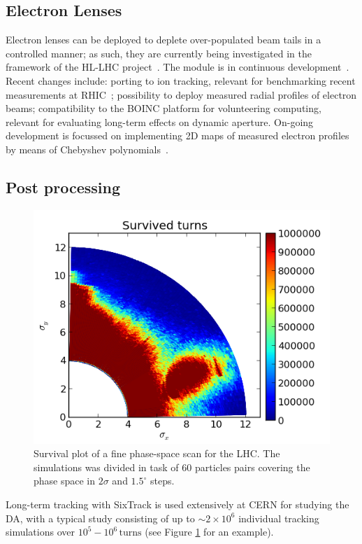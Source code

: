 \documentclass{ws-ijmpa}
\begin{document}
\subsection{Electron Lenses}
Electron lenses can be deployed to deplete over-populated beam tails in a controlled manner; as such, they are currently being investigated in the framework of the HL-LHC project~\cite{HL-TDR}. The module is in continuous development~\cite{elens-miriam}. Recent changes include: porting to ion tracking, relevant for benchmarking recent measurements at RHIC~\cite{RHIC-Mirarchi}; possibility to deploy measured radial profiles of electron beams; compatibility to the BOINC platform for volunteering computing, relevant for evaluating long-term effects on dynamic aperture. On-going development is focussed on implementing 2D maps of measured electron profiles by means of Chebyshev polynomials~\cite{GStancari-Chebyshev}.

\subsection{Post processing}
\begin{figure}[tbh]
\centering
 \includegraphics[width=\columnwidth]{surv_plot1.png}
 \caption{Survival plot of a fine phase-space scan for the LHC. The simulations was divided in task of $60$ particles pairs covering the phase space in $2\sigma$ and $1.5^\circ$ steps.}
 \label{fig:study}
\end{figure}

Long-term tracking with SixTrack is used extensively at CERN for studying the DA, with a typical study consisting of up to $\sim 2\times 10^{6}$ individual tracking simulations over $10^5-10^6\,\mathrm{turns}$ (see Figure \ref{fig:study} for an example).
\end{document}
